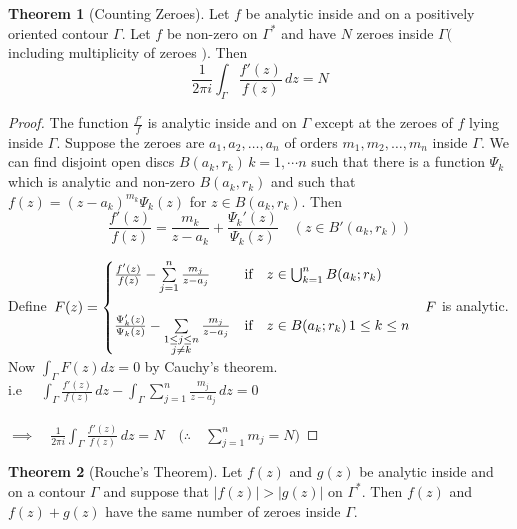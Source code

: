 \documentclass[11pt,a4paper]{article}
\theoremstyle{definition}
\newtheorem{thm}{Theorem}[section]
\begin{document}
\begin{thm}[Counting Zeroes]
Let $f$ be analytic inside and on a positively oriented contour $\Gamma$. Let $f$ be non-zero on $\Gamma^*$ and have $N$ zeroes inside $\Gamma($ including multiplicity of zeroes $)$. Then $$\frac{1}{2\pi i}\int_{\Gamma} \frac{f'(z)}{f(z)}\,dz = N$$
\end{thm}

\begin{proof}
The function $\frac{f'}{f}$ is analytic inside and on $\Gamma$ except at the zeroes of $f$ lying inside $\Gamma$. Suppose the zeroes are $a_1, a_2, \ldots, a_n$ of orders $m_1, m_2, \ldots, m_n$ inside $\Gamma$. We can find disjoint open discs $B(a_k,r_k)\, k = 1, \cdots n$ such that there is a function $\Psi_k$ which is analytic and non-zero $B(a_k,r_k)$ and such that $f(z) = (z - a_k)^{m_k}\Psi_k(z)$ for $z \in B(a_k, r_k)$. Then
$$\frac{f'(z)}{f(z)} = \frac{m_k}{z - a_k} + \frac{\Psi_k'(z)}{\Psi_k(z)}\quad  (z\in B'(a_k,r_k))$$


Define $\,\displaystyle{F(z) = \begin{cases}
\frac{f'(z)}{f(z)} - \sum\limits^n_{j=1}\frac{m_j}{z - a_j} & \text{if}\quad  z\in \bigcup^n_{k = 1}B(a_k;r_k)\\\\
\frac{\Psi_k'(z)}{\Psi_k(z)} - \sum\limits_{\substack{1\leq j\leq n\\ j\neq k}}\frac{m_j}{z - a_j} & \text{if}\quad  z \in B(a_k;r_k)\, 1\leq k\leq n
\end{cases}
}\\\quad  F$ is analytic.\\

Now $\displaystyle{\int_{\Gamma} F(z)dz = 0}$ by Cauchy's theorem. \\

i.e $\quad \displaystyle{\int_{\Gamma} \frac{f'(z)}{f(z)} \,dz - \int_{\Gamma} \sum^n_{j= 1} \frac{m_j}{z - a_j}\,dz = 0}$\\\\

$\implies \quad \displaystyle{\frac{1}{2\pi i}\int_{\Gamma} \frac{f'(z)}{f(z)}\,dz = N\quad  \Bigg(\therefore\quad \sum^n_{j= 1}m_j = N}\Bigg)$
\end{proof}

\begin{thm}[Rouche's Theorem]
Let $f(z)$ and $g(z)$ be analytic inside and on a contour $\Gamma$ and suppose that $\left|f(z)\right|> \left|g(z)\right|$ on $\Gamma^*$. Then $f(z)$ and $f(z) + g(z)$ have the same number of zeroes inside $\Gamma$.
\end{thm}
\end{document}
